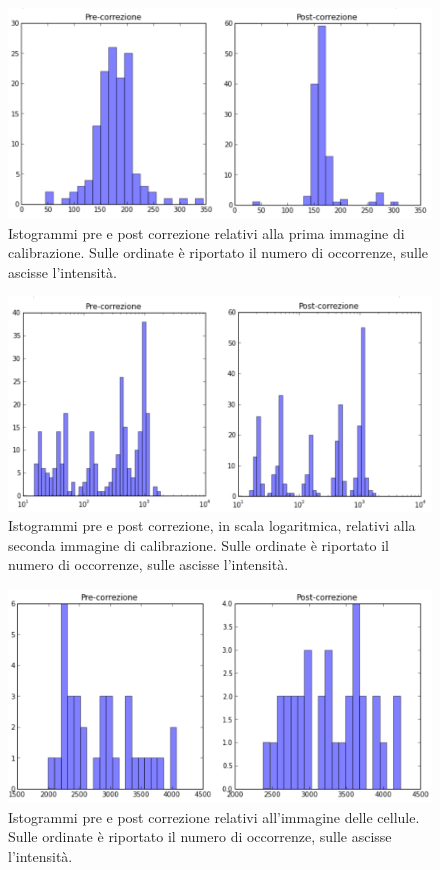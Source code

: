 \begin{figure}
 \centering
 \includegraphics[scale=.42]{img/CAP4isto1.png}
 \caption{\small{Istogrammi pre e post correzione relativi alla prima immagine di calibrazione. Sulle ordinate è riportato il numero di occorrenze, sulle ascisse l'intensità.}}
 \label{fig:isto1}
\end{figure}

\begin{figure}
 \centering
 \includegraphics[scale=.42]{img/CAP4isto2.png}
 \caption{\small{Istogrammi pre e post correzione, in scala logaritmica, relativi alla seconda immagine di calibrazione. Sulle ordinate è riportato il numero di occorrenze, sulle ascisse l'intensità.}}
 \label{fig:isto2}
\end{figure}

\begin{figure}
 \centering
 \includegraphics[scale=.42]{img/CAP4isto3.png}
 \caption{\small{Istogrammi pre e post correzione relativi all'immagine delle cellule. Sulle ordinate è riportato il numero di occorrenze, sulle ascisse l'intensità.}}
 \label{fig:isto3}
\end{figure}



